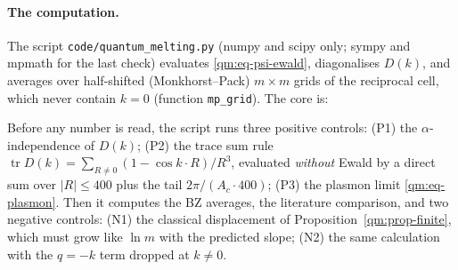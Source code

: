 \paragraph{The computation.} The script \texttt{code/quantum\_melting.py} (numpy and scipy only; sympy and mpmath
for the last check) evaluates \eqref{qm:eq-psi-ewald}, diagonalises $D(k)$, and averages over half-shifted
(Monkhorst--Pack) $m\times m$ grids of the reciprocal cell, which never contain $k=0$ (function \texttt{mp\_grid}). The core is:


Before any number is read, the script runs three positive controls: (P1) the $\alpha$-independence of $D(k)$;
(P2) the trace sum rule $\operatorname{tr}D(k)=\sum_{R\ne0}(1-\cos k\cdot R)/R^3$, evaluated \emph{without} Ewald by a
direct sum over $|R|\le400$ plus the tail $2\pi/(A_c\cdot400)$; (P3) the plasmon limit \eqref{qm:eq-plasmon}. Then it
computes the BZ averages, the literature comparison, and two negative controls: (N1) the classical displacement of
Proposition~\ref{qm:prop-finite}, which must grow like $\ln m$ with the predicted slope; (N2) the same calculation
with the $q=-k$ term dropped at $k\ne0$.

